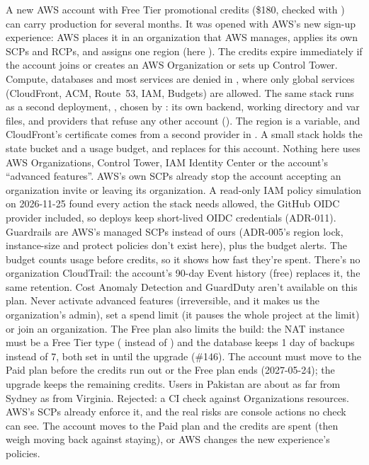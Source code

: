   {A new AWS account with Free Tier promotional credits (\$180, checked with
   ) can carry production for several months. It was
   opened with AWS's new sign-up experience: AWS places it in an organization that AWS manages,
   applies its own SCPs and RCPs, and assigns one region (here ). The credits
   expire immediately if the account joins or creates an AWS Organization or sets up Control Tower.
   Compute, databases and most services are denied in , where only global services
   (CloudFront, ACM, Route~53, IAM, Budgets) are allowed.}
  {The same  stack runs as a second deployment, , chosen by
   : its own backend, working directory and var files, and providers that
   refuse any other account (). The region is a variable, and
   CloudFront's certificate comes from a second provider in . A small
    stack holds the state bucket and a usage budget, and replaces
    for this account. Nothing here uses AWS Organizations, Control Tower,
   IAM Identity Center or the account's ``advanced features''. AWS's own SCPs already stop the
   account accepting an organization invite or leaving its organization. A read-only IAM policy
   simulation on 2026-11-25 found every action the stack needs allowed, the GitHub OIDC provider
   included, so deploys keep short-lived OIDC credentials (ADR-011).}
  {Guardrails are AWS's managed SCPs instead of ours (ADR-005's region lock, instance-size and
   protect policies don't exist here), plus the budget alerts. The budget counts usage before
   credits, so it shows how fast they're spent. There's no organization CloudTrail: the account's
   90-day Event history (free) replaces it, the same retention. Cost Anomaly Detection and
   GuardDuty aren't available on this plan. Never activate advanced features (irreversible, and
   it makes us the organization's admin), set a spend limit (it pauses the whole project at the
   limit) or join an organization. The Free plan also limits the build: the NAT instance must be a
   Free Tier type ( instead of ) and the database keeps 1 day of
   backups instead of 7, both set in  until the
   upgrade (\#146). The account must move to the Paid plan before the credits run
   out or the Free plan ends (2027-05-24); the upgrade keeps the remaining credits. Users in
   Pakistan are about as far from Sydney as from Virginia. Rejected: a CI check against
   Organizations resources. AWS's SCPs already enforce it, and the real risks are console actions
   no check can see.}
  {The account moves to the Paid plan and the credits are spent (then weigh moving back against
   staying), or AWS changes the new experience's policies.}


